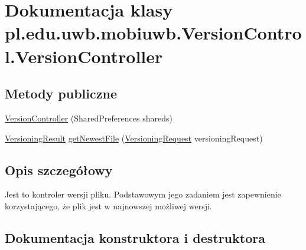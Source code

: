 \hypertarget{classpl_1_1edu_1_1uwb_1_1mobiuwb_1_1_version_control_1_1_version_controller}{}\section{Dokumentacja klasy pl.\+edu.\+uwb.\+mobiuwb.\+Version\+Control.\+Version\+Controller}
\label{classpl_1_1edu_1_1uwb_1_1mobiuwb_1_1_version_control_1_1_version_controller}
\subsection*{Metody publiczne}
\begin{DoxyCompactItemize}
\item 
\hyperlink{classpl_1_1edu_1_1uwb_1_1mobiuwb_1_1_version_control_1_1_version_controller_a8726297ad7885c280c49226ef8376e1b}{Version\+Controller} (Shared\+Preferences shareds)
\item 
\hyperlink{classpl_1_1edu_1_1uwb_1_1mobiuwb_1_1_version_control_1_1_models_1_1_versioning_result}{Versioning\+Result} \hyperlink{classpl_1_1edu_1_1uwb_1_1mobiuwb_1_1_version_control_1_1_version_controller_a54746592717d40a84e5ac9a1810d5ca1}{get\+Newest\+File} (\hyperlink{classpl_1_1edu_1_1uwb_1_1mobiuwb_1_1_version_control_1_1_models_1_1_versioning_request}{Versioning\+Request} versioning\+Request)
\end{DoxyCompactItemize}


\subsection{Opis szczegółowy}
Jest to kontroler wersji pliku. Podstawowym jego zadaniem jest zapewnienie korzystającego, że plik jest w najnowszej możliwej wersji. 

\subsection{Dokumentacja konstruktora i destruktora}
\hypertarget{classpl_1_1edu_1_1uwb_1_1mobiuwb_1_1_version_control_1_1_version_controller_a8726297ad7885c280c49226ef8376e1b}{}
